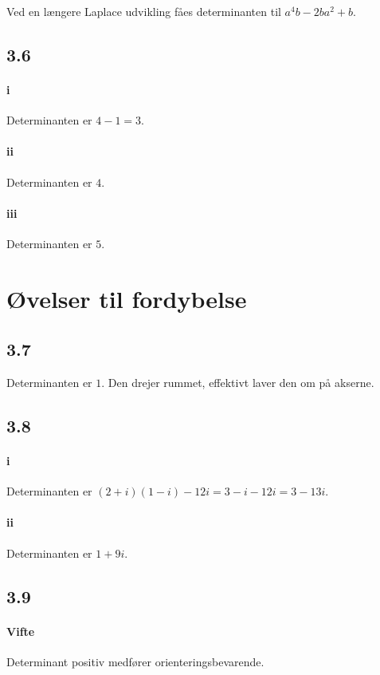			Ved en længere Laplace udvikling fåes determinanten til $a^4b-2ba^2+b$.

		\subsection{3.6}

			\paragraph{i} Determinanten er $4-1=3$.

			\paragraph{ii} Determinanten er $4$.   

			\paragraph{iii} Determinanten er $5$.   

	\section{Øvelser til fordybelse}

		\subsection{3.7}

			Determinanten er $1$. Den drejer rummet, effektivt laver den om på akserne.

		\subsection{3.8}

			\paragraph{i} Determinanten er $(2+i)(1-i)-12i=3-i-12i=3-13i$.

			\paragraph{ii} Determinanten er $1+9i$.

		\subsection{3.9}

			\paragraph{Vifte} Determinant positiv medfører orienteringsbevarende.  



